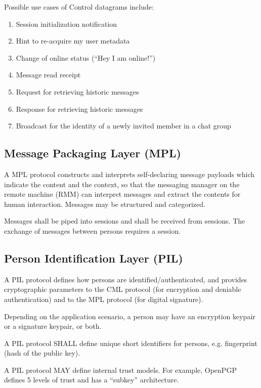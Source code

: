 \documentclass[a4paper,11pt]{article}
\begin{document}
Possible use cases of Control datagrams include:

\begin{enumerate}
    \item Session initialization notification
    \item Hint to re-acquire my user metadata
    \item Change of online status (``Hey I am online!'')
    \item Message read receipt
    \item Request for retrieving historic messages
    \item Response for retrieving historic messages
    \item Broadcast for the identity of a newly invited member in a chat group
\end{enumerate}

\subsection{Message Packaging Layer (MPL)}

A MPL protocol constructs and interprets self-declaring message payloads which indicate the content and the context,
so that the messaging manager on the remote machine (RMM) can interpret messages and extract the contents for human interaction.
Messages may be structured and categorized.

Messages shall be piped into sessions and shall be received from sessions.
The exchange of messages between persons requires a session.

\subsection{Person Identification Layer (PIL)}

A PIL protocol defines how persons are identified/authenticated,
and provides cryptographic parameters to the CML protocol (for encryption and deniable authentication)
and to the MPL protocol (for digital signature).

Depending on the application scenario, a person may have an encryption keypair or a signature keypair, or both.

A PIL protocol SHALL define unique short identifiers for persons, e.g. fingerprint (hash of the public key).

A PIL protocol MAY define internal trust models. For example, OpenPGP defines 5 levels of trust and has a ``subkey'' architecture.
\end{document}
